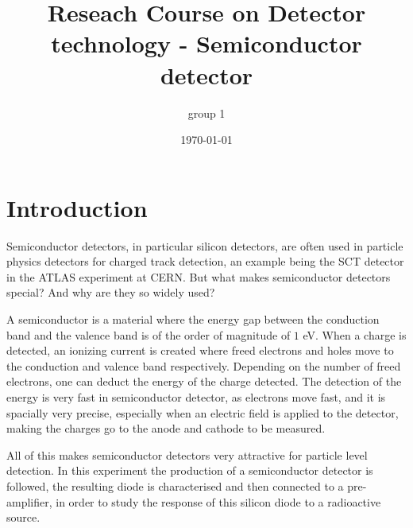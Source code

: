 \documentclass[12pt]{article}
\title{Reseach Course on Detector technology - Semiconductor detector}
\author{group 1}
\date{\today}
\begin{document}

\maketitle

\clearpage
  
\tableofcontents
  
  
  
  
\cleardoublepage

%
%

\section{Introduction}

Semiconductor detectors, in particular silicon detectors, are often used in particle physics detectors for charged track detection, an example being the SCT detector in the ATLAS experiment at CERN. But what makes semiconductor detectors special? And why are they so widely used?

A semiconductor is a material where the energy gap between the conduction band and the valence band is of the order of magnitude of $1$ eV. When a charge is detected, an ionizing current is created where freed electrons and holes move to the conduction and valence band respectively. Depending on the number of freed electrons, one can deduct the energy of the charge detected. The detection of the energy is very fast in semiconductor detector, as electrons move fast, and it is spacially very precise, especially when an electric field is applied to the detector, making the charges go to the anode and cathode to be measured.

All of this makes semiconductor detectors very attractive for particle level detection.
In this experiment the production of a semiconductor detector is followed, the resulting diode is characterised and then connected to a pre-amplifier, in order to study the response of this silicon diode to a radioactive source.

%
%
\end{document}
